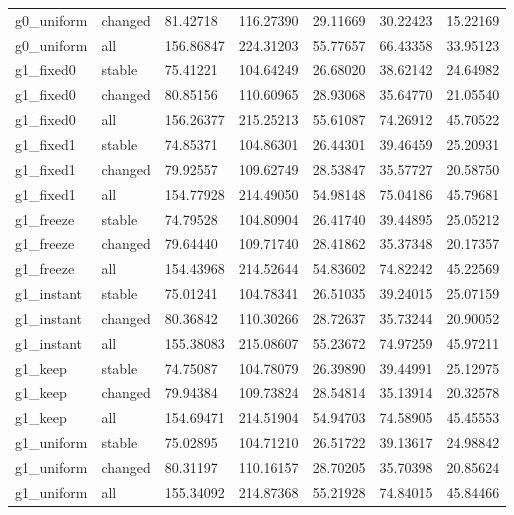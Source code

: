 \begin{longtable}{lllllll}
g0\_uniform & changed & 81.42718 & 116.27390 & 29.11669 & 30.22423 & 15.22169 \\
g0\_uniform & all & 156.86847 & 224.31203 & 55.77657 & 66.43358 & 33.95123 \\
g1\_fixed0 & stable & 75.41221 & 104.64249 & 26.68020 & 38.62142 & 24.64982 \\
g1\_fixed0 & changed & 80.85156 & 110.60965 & 28.93068 & 35.64770 & 21.05540 \\
g1\_fixed0 & all & 156.26377 & 215.25213 & 55.61087 & 74.26912 & 45.70522 \\
g1\_fixed1 & stable & 74.85371 & 104.86301 & 26.44301 & 39.46459 & 25.20931 \\
g1\_fixed1 & changed & 79.92557 & 109.62749 & 28.53847 & 35.57727 & 20.58750 \\
g1\_fixed1 & all & 154.77928 & 214.49050 & 54.98148 & 75.04186 & 45.79681 \\
g1\_freeze & stable & 74.79528 & 104.80904 & 26.41740 & 39.44895 & 25.05212 \\
g1\_freeze & changed & 79.64440 & 109.71740 & 28.41862 & 35.37348 & 20.17357 \\
g1\_freeze & all & 154.43968 & 214.52644 & 54.83602 & 74.82242 & 45.22569 \\
g1\_instant & stable & 75.01241 & 104.78341 & 26.51035 & 39.24015 & 25.07159 \\
g1\_instant & changed & 80.36842 & 110.30266 & 28.72637 & 35.73244 & 20.90052 \\
g1\_instant & all & 155.38083 & 215.08607 & 55.23672 & 74.97259 & 45.97211 \\
g1\_keep & stable & 74.75087 & 104.78079 & 26.39890 & 39.44991 & 25.12975 \\
g1\_keep & changed & 79.94384 & 109.73824 & 28.54814 & 35.13914 & 20.32578 \\
g1\_keep & all & 154.69471 & 214.51904 & 54.94703 & 74.58905 & 45.45553 \\
g1\_uniform & stable & 75.02895 & 104.71210 & 26.51722 & 39.13617 & 24.98842 \\
g1\_uniform & changed & 80.31197 & 110.16157 & 28.70205 & 35.70398 & 20.85624 \\
g1\_uniform & all & 155.34092 & 214.87368 & 55.21928 & 74.84015 & 45.84466 \\
\bottomrule
\end{longtable}
